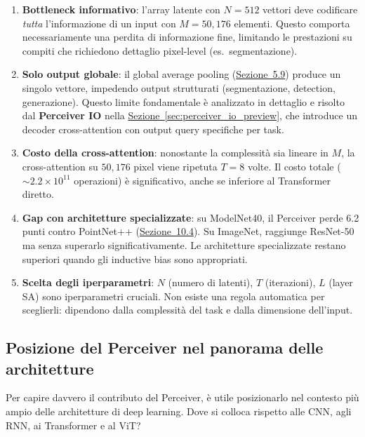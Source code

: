 \documentclass[12pt,a4paper]{article}
\begin{document}
\begin{enumerate}[label=(\alph*)]
    \item \textbf{Bottleneck informativo}: l'array latente con $N = 512$ vettori deve codificare \emph{tutta} l'informazione di un input con $M = 50{,}176$ elementi. Questo comporta necessariamente una perdita di informazione fine, limitando le prestazioni su compiti che richiedono dettaglio pixel-level (es.\ segmentazione).

    \item \textbf{Solo output globale}: il global average pooling (\hyperref[sec:pooling]{Sezione~5.9}) produce un singolo vettore, impedendo output strutturati (segmentazione, detection, generazione). Questo limite fondamentale \`e analizzato in dettaglio e risolto dal \textbf{Perceiver IO} nella \hyperref[sec:perceiver_io_preview]{Sezione~\ref*{sec:perceiver_io_preview}}, che introduce un decoder cross-attention con output query specifiche per task.

    \item \textbf{Costo della cross-attention}: nonostante la complessit\`a sia lineare in $M$, la cross-attention su $50{,}176$ pixel viene ripetuta $T = 8$ volte. Il costo totale ($\sim 2.2 \times 10^{11}$ operazioni) \`e significativo, anche se inferiore al Transformer diretto.

    \item \textbf{Gap con architetture specializzate}: su ModelNet40, il Perceiver perde 6.2 punti contro PointNet++ (\hyperref[sec:modelnet]{Sezione~10.4}). Su ImageNet, raggiunge ResNet-50 ma senza superarlo significativamente. Le architetture specializzate restano superiori quando gli inductive bias sono appropriati.

    \item \textbf{Scelta degli iperparametri}: $N$ (numero di latenti), $T$ (iterazioni), $L$ (layer SA) sono iperparametri cruciali. Non esiste una regola automatica per sceglierli: dipendono dalla complessit\`a del task e dalla dimensione dell'input.
\end{enumerate}

\subsection{Posizione del Perceiver nel panorama delle architetture} \label{sec:panorama_architetture}

Per capire davvero il contributo del Perceiver, \`e utile posizionarlo nel contesto pi\`u ampio delle architetture di deep learning. Dove si colloca rispetto alle CNN, agli RNN, ai Transformer e al ViT?
\end{document}
